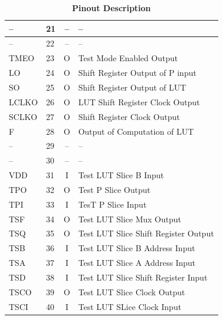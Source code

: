 \documentclass[a4paper]{article}
\begin{document}
\begin{table}[H]
\begin{tabular}{| l | l | c | p{10cm}|}
                --              & 21               & --           & -- \\ \hline
                --              & 22               & --           & -- \\ \hline
                TMEO            & 23               & O            & Test Mode Enabled Output \\ \hline
                LO              & 24               & O            & Shift Register Output of P input \\ \hline
                SO              & 25               & O            & Shift Register Output of LUT \\ \hline
                LCLKO           & 26               & O            & LUT Shift Register Clock Output \\ \hline
                SCLKO           & 27               & O            & Shift Register Clock Output \\ \hline
                F               & 28               & O            & Output of Computation of LUT \\ \hline
                --              & 29               & --           & -- \\ \hline
                --              & 30               & --           & -- \\ \hline

                VDD             & 31               & I            & Test LUT Slice B Input \\ \hline
                TPO             & 32               & O              & Test P Slice Output \\ \hline
                TPI             & 33                & I             & TesT P Slice Input \\ \hline
                TSF             & 34               & O            & Test LUT Slice Mux Output \\ \hline
                TSQ             & 35               & O            & Test LUT Slice Shift Register Output \\ \hline
                TSB             & 36               & I            & Test LUT Slice B Address Input \\ \hline
                TSA             & 37               & I            & Test LUT Slice A Address Input \\ \hline
                TSD             & 38               & I            & Test LUT Slice Shift Register Input \\ \hline
                TSCO            & 39               & O            & Test LUT Slice Clock Output \\ \hline
                TSCI            & 40               & I            & Test LUT SLice Clock Input \\ \hline
        \end{tabular}
        \caption{\textbf{Pinout Description}}
    \end{table}
\end{document}
